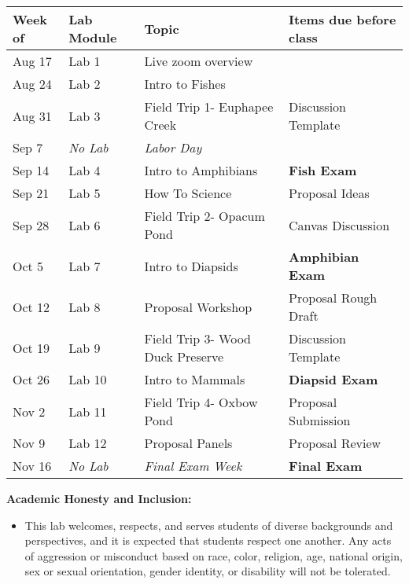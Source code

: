 \documentclass[11pt, a4paper]{article}
\begin{document}
\begin{table}[h]
\centering
\label{Table:Schedule}
\begin{tabular}{llll}\hline
Week of & Lab Module          & Topic                            & Items due before class  \\ \hline
Aug 17  & Lab 1               & Live zoom overview               &                         \\
Aug 24  & Lab 2               & Intro to Fishes                  &                         \\
Aug 31  & Lab 3               & Field Trip 1- Euphapee Creek     & Discussion Template     \\
Sep 7   & \textit{No Lab}     & \textit{Labor Day}               &                         \\
Sep 14  & Lab 4               & Intro to Amphibians              & \textbf{Fish Exam}      \\
Sep 21  & Lab 5               & How To Science                   & Proposal Ideas          \\
Sep 28  & Lab 6               & Field Trip 2- Opacum Pond        & Canvas Discussion       \\
Oct 5   & Lab 7               & Intro to Diapsids                & \textbf{Amphibian Exam} \\
Oct 12  & Lab 8               & Proposal Workshop                & Proposal Rough Draft    \\
Oct 19  & Lab 9               & Field Trip 3- Wood Duck Preserve & Discussion Template     \\
Oct 26  & Lab 10              & Intro to Mammals                 & \textbf{Diapsid Exam}   \\
Nov 2   & Lab 11              & Field Trip 4- Oxbow Pond         & Proposal Submission     \\
Nov 9   & Lab 12              & Proposal Panels                  & Proposal Review         \\
Nov 16  & \textit{No Lab}     & \textit{Final Exam Week}         & \textbf{Final Exam}     \\ \hline
\end{tabular}
\bigskip{}
\end{table}

\noindent\textbf{Academic Honesty and Inclusion:}
\begin{itemize}
\item{This lab welcomes, respects, and serves students of diverse backgrounds and perspectives, and it is expected that students respect one another. Any acts of aggression or misconduct based on race, color, religion, age, national origin, sex or sexual orientation, gender identity, or disability will not be tolerated.}
\end{itemize} 
\end{document}
